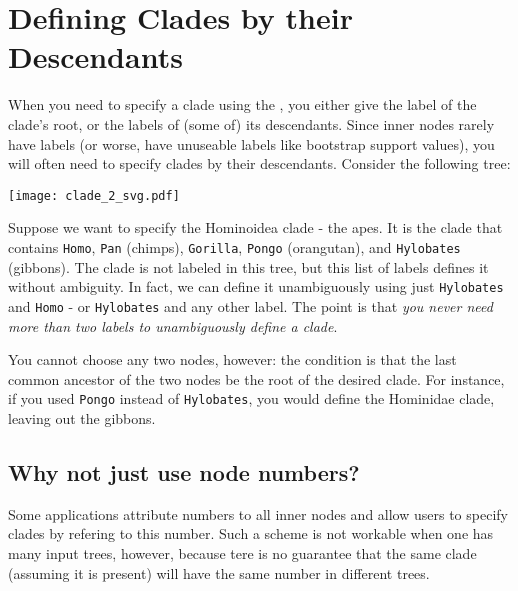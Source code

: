 \chapter{Defining Clades by their Descendants}
\label{sct_def_clades}

When you need to specify a clade using the \nutils{}, you either give the label
of the clade's root, or the labels of (some of) its descendants. Since inner
nodes rarely have labels (or worse, have unuseable labels like bootstrap
support values), you will often need to specify clades by their descendants.
Consider the following tree:

\begin{center}
\texttt{[image: clade\_2\_svg.pdf]} 
\end{center}

\noindent{}Suppose we want to specify the Hominoidea clade - the apes. It is
the clade that contains \texttt{Homo}, \texttt{Pan} (chimps), \texttt{Gorilla},
\texttt{Pongo} (orangutan), and \texttt{Hylobates} (gibbons). The clade is not
labeled in this tree, but this list of labels defines it without ambiguity. In
fact, we can define it unambiguously using just \texttt{Hylobates} and
\texttt{Homo} - or \texttt{Hylobates} and any other label. The point is that
\emph{you never need more than two labels to unambiguously define a clade}.

You cannot choose any two nodes, however: the condition is that the last
common ancestor of the two nodes be the root of the desired clade. For
instance, if you used \texttt{Pongo} instead of \texttt{Hylobates}, you would
define the Hominidae clade, leaving out the gibbons.

\section{Why not just use node numbers?}

Some applications attribute numbers to all inner nodes and allow users to
specify clades by refering to this number. Such a scheme is not workable when
one has many input trees, however, because tere is no guarantee that the same
clade (assuming it is present) will have the same number in different trees.

